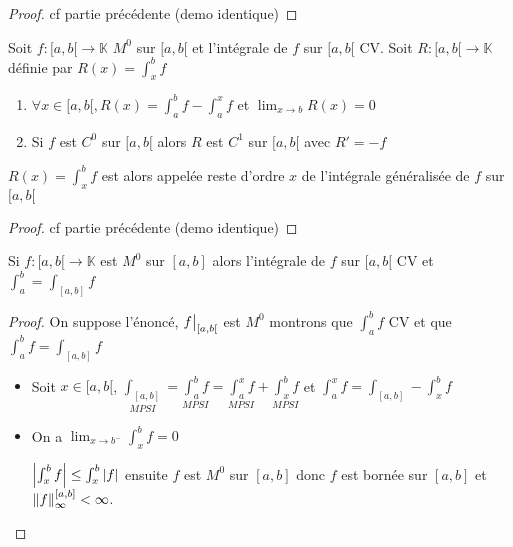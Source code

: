 \documentclass[11pt,hidelinks]{book}
\theoremstyle{mytheoremstyle}
\theoremstyle{mytheoremstyle}
\theoremstyle{mytheoremstyle}
\theoremstyle{mytheoremstyle}
\theoremstyle{mytheoremstyle}
\theoremstyle{mytheoremstyle}
\theoremstyle{mytheoremstyle}
\theoremstyle{mytheoremstyle}
\theoremstyle{myproblemstyle}
\def\mbb#1{\mathbb{#1}}
\def\ib#1{\int_{a}^{b} #1}
\def\bK{\mbb{K}}
\def\ab{[a,b[}
\newcommand{\func}[3]{#1\colon#2\to#3}
\newcommand\restr[2]{{%
  \left.\kern-\nulldelimiterspace %
  #1 %
  \vphantom{\big|} %
  \right|_{#2} %
  }}
\begin{document}
\begin{adjustwidth}{-2em}{-1em}
\begin{prop}
\begin{enumerate}
            \begin{proof}
                cf partie précédente (demo identique)
            \end{proof}
        \end{enumerate}
        \end{prop}
        \begin{theorem}
            Soit $\func{f}{\ab}{\bK}$ $M^0$ sur $\ab$ et l'intégrale 
            de $f$ sur $\ab$ CV. Soit $\func{R}{\ab}{\bK}$ définie par $R(x) = \int_{x}^{b} f$
            \begin{enumerate} 
            \item $\forall x \in \ab, R(x) = \ib{f} - \int_{a}^{x} f$ et $\lim_{x \to b} R(x) = 0$ 
            \item Si $f$ est $C^0$ sur $\ab$ alors $R$ est $C^1$ sur $\ab$ avec $R' = -f$
            \end{enumerate}
            \begin{rmq}
                $R(x) = \int_{x}^{b} f$ est alors appelée reste d'ordre $x$ de l'intégrale généralisée de $f$ sur $\ab$
            \end{rmq}
            \begin{proof}
                cf partie précédente (demo identique)
            \end{proof}
        \end{theorem}
        \begin{theorem}
            Si $\func{f}{\ab}{\bK}$ est $M^0$ sur $[a,b]$ alors l'intégrale 
            de $f$ sur $\ab$ CV et $\int_{a}^{b} = \int_{[a,b]} f$
            \begin{proof}
                On suppose l'énoncé, $\restr{f}{[a,b[}$ est $M^0$ 
                montrons que $\ib{f}$ CV et que $\ib{f} = \int_{[a,b]} f$
                \begin{itemize}[label=$\circ$] 
                \item Soit $x \in \ab$, 
                $\underset{MPSI}{\int_{[a,b]}} = \underset{MPSI}{\ib{f}} = \underset{MPSI}{\int_{a}^{x} f} + \underset{MPSI}{\int_{x}^{b} f}$
                et $\int_{a}^{x} f = \int_{[a,b]} - \int_{x}^{b} f$
                 
                \item On a $\lim_{x \to b^-} \int_{x}^{b} f = 0$ 
                \begin{ef}
                    $\abs{\int_{x}^{b} f} \leq \int_{x}^{b} \abs{f}$ ensuite $f$ est $M^0$ sur $[a,b]$ donc $f$ est bornée 
                    sur $[a,b]$ et $\norm{f}_{\infty}^{[a,b]} < \infty$.
                     

\end{ef}
\end{itemize}
\end{proof}
\end{theorem}
\end{adjustwidth}
\end{document}
